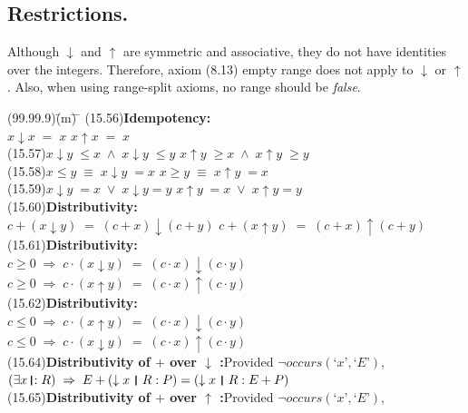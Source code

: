 \documentclass{amsart}
\newcommand{\lgap}{2pt}                             %
\newcommand{\llgap}{6pt}                            %
\newcommand{\equivs}{\ensuremath{\;\equiv\;}}       %
\newcommand{\impls}{\ensuremath{\;\Rightarrow\;}}   %
\newcommand{\thedr}{\rule[-.25ex]{.32mm}{1.75ex}}   %
\newcommand{\dr}{\;\,\thedr\,\;}                    %
\newcommand{\rb}{:}                                 %
\newcommand{\drrb}{\;\thedr\,{:}\;}                 %
\newcommand{\ext}{\exists}                          %
\newcommand{\Lq}{\mbox{`}}
\newcommand{\Rq}{\mbox{'}}
\begin{document}
\subsection*{Restrictions.}
Although $\downarrow$ and $\uparrow$ are symmetric and associative, they do not have identities over the integers.
Therefore, axiom (8.13) empty range does not apply to $\downarrow$ or $\uparrow$. Also, when using range-split
axioms, no range should be \emph{false}.\\[\lgap]

\begin{tabbing}
(99.99.9)\;\=(m)\;\= \makebox[2in]{ } \= \kill
(15.56)\>\textbf{Idempotency:}\\[\lgap]
       \>$x\downarrow x \;=\; x$ \>\> $x\uparrow x \;=\; x$\\[\lgap]
(15.57)\>$x\downarrow y\;\le x \;\land\; x\downarrow y\;\le y$ \>\> $x\uparrow y\;\ge x \;\land\; x\uparrow y\;\ge y$\\[\lgap]
(15.58)\>$x\le y \equivs x\downarrow y \;= x$ \>\> $x\ge y \equivs x\uparrow y \;= x$\\[\lgap]
(15.59)\>$x\downarrow y\; = x \;\lor\; x\downarrow y = y$ \>\> $x\uparrow y\; = x \;\lor\; x\uparrow y = y$\\[\lgap]
(15.60)\>\textbf{Distributivity:}\\[\lgap]
       \>$c + (x\downarrow y) \;=\; (c + x)\downarrow (c + y)$ \>\> $c + (x\uparrow y) \;=\; (c + x)\uparrow (c + y)$\\[\lgap]
(15.61)\>\textbf{Distributivity:}\\[\lgap]
       \>$c\ge 0\impls c\cdot (x\downarrow y) \;=\; (c\cdot x)\downarrow (c\cdot y)$\\[\lgap]
       \>$c\ge 0\impls c\cdot (x\uparrow y) \;=\; (c\cdot x)\uparrow (c\cdot y)$\\[\lgap]
(15.62)\>\textbf{Distributivity:}\\[\lgap]
       \>$c\le 0\impls c\cdot (x\uparrow y) \;=\; (c\cdot x)\downarrow (c\cdot y)$\\[\lgap]
       \>$c\le 0\impls c\cdot (x\downarrow y) \;=\; (c\cdot x)\uparrow (c\cdot y)$\\[\llgap]
(15.64)\>\textbf{Distributivity of $+$ over $\downarrow$ :}\quad Provided $\neg occurs(\Lq x\Rq ,\Lq E\Rq)$,\\[\lgap]
       \>$(\ext x\drrb R) \impls E + (\downarrow x\dr R\rb P) = (\downarrow x\dr R\rb E + P)$\\[\lgap]
(15.65)\>\textbf{Distributivity of $+$ over $\uparrow$ :}\quad Provided $\neg occurs(\Lq x\Rq ,\Lq E\Rq)$,\\[\lgap]

\end{tabbing}
\end{document}

